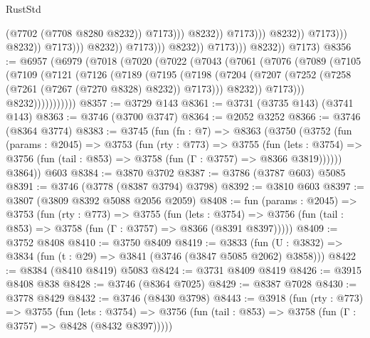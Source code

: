 \begin{lexlean}{RustStd}
\begin{coremodule}
                                                                  (@7702 (@7708 @8280 @8232))
                                                                  @7173)))
                                                            @8232))
                                                        @7173)))
                                                  @8232))
                                              @7173)))
                                        @8232))
                                    @7173)))
                              @8232))
                          @7173)))
                    @8232))
                @7173)))
          @8232))
      @7173)
@8356 := @6957
    (@6979
      (@7018
        (@7020
          (@7022
            (@7043
              (@7061
                (@7076
                  (@7089
                    (@7105
                      (@7109
                        (@7121
                          (@7126
                            (@7189
                              (@7195
                                (@7198
                                  (@7204
                                    (@7207
                                      (@7252 (@7258 (@7261 (@7267 (@7270 @8328) @8232)) @7173)))
                                    @8232))
                                @7173)))
                          @8232)))))))))))
@8357 := @3729 @143
@8361 := @3731 (@3735 @143) (@3741 @143)
@8363 := @3746 (@3700 @3747)
@8364 := @2052 @3252
@8366 := @3746 (@8364 @3774)
@8383 := @3745
    (fun (fn : @7) =>
    @8363
      (@3750
        (@3752
          (fun (params : @2045) =>
          @3753
            (fun (rty : @773) =>
            @3755
              (fun (lets : @3754) =>
              @3756 (fun (tail : @853) => @3758 (fun (Γ : @3757) => @8366 @3819))))))
        @3864))
    @603
@8384 := @3870 @3702
@8387 := @3786 (@3787 @603) @5085
@8391 := @3746 (@3778 (@8387 @3794) @3798)
@8392 := @3810 @603
@8397 := @3807 (@3809 @8392 @5088 @2056 @2059)
@8408 := fun (params : @2045) =>
  @3753
    (fun (rty : @773) =>
    @3755
      (fun (lets : @3754) =>
      @3756 (fun (tail : @853) => @3758 (fun (Γ : @3757) => @8366 (@8391 @8397)))))
@8409 := @3752 @8408
@8410 := @3750 @8409
@8419 := @3833 (fun (U : @3832) => @3834 (fun (t : @29) => @3841 (@3746 (@3847 @5085 @2062) @3858)))
@8422 := @8384 (@8410 @8419) @5083
@8424 := @3731 @8409 @8419
@8426 := @3915 @8408 @838
@8428 := @3746 (@8364 @7025)
@8429 := @8387 @7028
@8430 := @3778 @8429
@8432 := @3746 (@8430 @3798)
@8443 := @3918
    (fun (rty : @773) =>
    @3755
      (fun (lets : @3754) =>
      @3756 (fun (tail : @853) => @3758 (fun (Γ : @3757) => @8428 (@8432 @8397)))))

\end{coremodule}
\end{lexlean}
